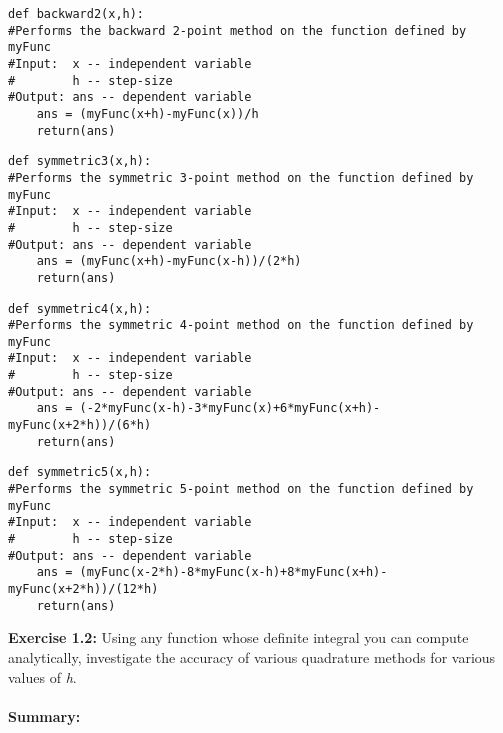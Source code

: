 \documentclass[10pt]{article}
\begin{document}
\begin{lstlisting}
def backward2(x,h):
#Performs the backward 2-point method on the function defined by myFunc
#Input:  x -- independent variable
#        h -- step-size
#Output: ans -- dependent variable
    ans = (myFunc(x+h)-myFunc(x))/h
    return(ans)
\end{lstlisting}
\begin{lstlisting}
def symmetric3(x,h):
#Performs the symmetric 3-point method on the function defined by myFunc
#Input:  x -- independent variable
#        h -- step-size
#Output: ans -- dependent variable
    ans = (myFunc(x+h)-myFunc(x-h))/(2*h)
    return(ans)
\end{lstlisting}
\begin{lstlisting}
def symmetric4(x,h):
#Performs the symmetric 4-point method on the function defined by myFunc
#Input:  x -- independent variable
#        h -- step-size
#Output: ans -- dependent variable
    ans = (-2*myFunc(x-h)-3*myFunc(x)+6*myFunc(x+h)-myFunc(x+2*h))/(6*h)
    return(ans)
\end{lstlisting}
\begin{lstlisting}
def symmetric5(x,h):
#Performs the symmetric 5-point method on the function defined by myFunc
#Input:  x -- independent variable
#        h -- step-size
#Output: ans -- dependent variable
    ans = (myFunc(x-2*h)-8*myFunc(x-h)+8*myFunc(x+h)-myFunc(x+2*h))/(12*h)
    return(ans)
\end{lstlisting}
\newpage
\noindent
\textbf{Exercise 1.2:} Using any function whose definite integral you can compute analytically, investigate the accuracy of various quadrature methods for various values of \textit{h}. \\
\\
\textbf{Summary:}
\end{document}
